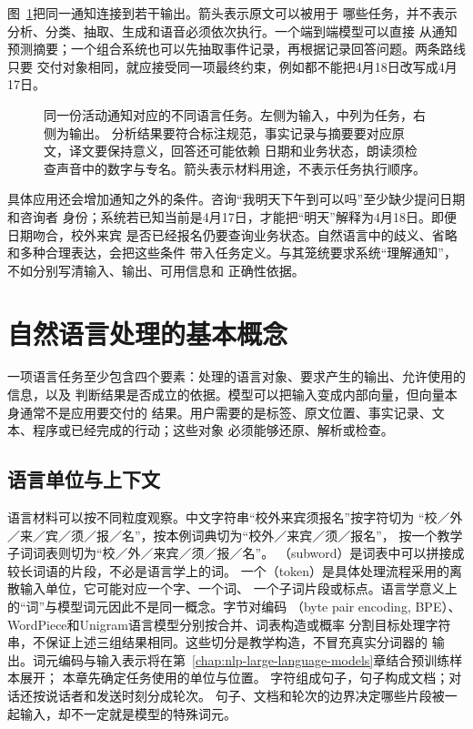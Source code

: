 图~\ref{fig:nlp-one-text-many-tasks}把同一通知连接到若干输出。箭头表示原文可以被用于
哪些任务，并不表示分析、分类、抽取、生成和语音必须依次执行。一个端到端模型可以直接
从通知预测摘要；一个组合系统也可以先抽取事件记录，再根据记录回答问题。两条路线只要
交付对象相同，就应接受同一项最终约束，例如都不能把4月18日改写成4月17日。

\begin{figure}[htbp]
  \centering
  
  \caption{同一份活动通知对应的不同语言任务。左侧为输入，中列为任务，右侧为输出。
  分析结果要符合标注规范，事实记录与摘要要对应原文，译文要保持意义，回答还可能依赖
  日期和业务状态，朗读须检查声音中的数字与专名。箭头表示材料用途，不表示任务执行顺序。}
  \label{fig:nlp-one-text-many-tasks}
\end{figure}

具体应用还会增加通知之外的条件。咨询“我明天下午到可以吗”至少缺少提问日期和咨询者
身份；系统若已知当前是4月17日，才能把“明天”解释为4月18日。即便日期吻合，校外来宾
是否已经报名仍要查询业务状态。自然语言中的歧义、省略和多种合理表达，会把这些条件
带入任务定义。与其笼统要求系统“理解通知”，不如分别写清输入、输出、可用信息和
正确性依据。

\FloatBarrier
\section{自然语言处理的基本概念}
\label{sec:nlp-basic-concepts}

一项语言任务至少包含四个要素：处理的语言对象、要求产生的输出、允许使用的信息，以及
判断结果是否成立的依据。模型可以把输入变成内部向量，但向量本身通常不是应用要交付的
结果。用户需要的是标签、原文位置、事实记录、文本、程序或已经完成的行动；这些对象
必须能够还原、解析或检查。

\subsection{语言单位与上下文}
\label{sec:nlp-units-and-context}

语言材料可以按不同粒度观察。中文字符串“校外来宾须报名”按字符切为
“校／外／来／宾／须／报／名”，按本例词典切为“校外／来宾／须／报名”，
按一个教学子词词表则切为“校／外／来宾／须／报／名”。
（subword）是词表中可以拼接成较长词语的片段，不必是语言学上的词。
一个（token）是具体处理流程采用的离散输入单位，它可能对应一个字、一个词、
一个子词片段或标点。语言学意义上的“词”与模型词元因此不是同一概念。字节对编码
（byte pair encoding, BPE）、WordPiece和Unigram语言模型分别按合并、词表构造或概率
分割目标处理字符串，不保证上述三组结果相同。这些切分是教学构造，不冒充真实分词器的
输出。词元编码与输入表示将在第~\ref{chap:nlp-large-language-models}章结合预训练样本展开；
本章先确定任务使用的单位与位置。
字符组成句子，句子构成文档；对话还按说话者和发送时刻分成轮次。
句子、文档和轮次的边界决定哪些片段被一起输入，却不一定就是模型的特殊词元。

